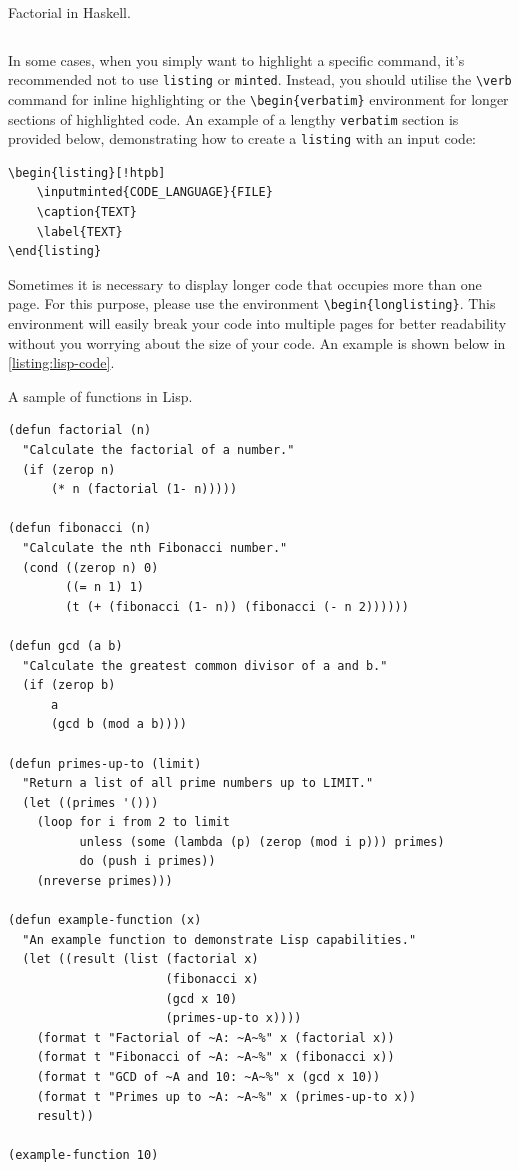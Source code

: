 \begin{listing}[!htpb]
\caption{Factorial in Haskell.}
\label{listing:haskell-code}
\inputminted{haskell}{Code/Factorial.hs}
\end{listing}

In some cases, when you simply want to highlight a specific command, it's recommended not to use \verb|listing| or \verb|minted|. Instead, you should utilise the \verb|\verb| command for inline highlighting or the \verb|\begin{verbatim}| environment for longer sections of highlighted code. An example of a lengthy \verb|verbatim| section is provided below, demonstrating how to create a \verb|listing| with an input code:

\begin{verbatim}
\begin{listing}[!htpb]
    \inputminted{CODE_LANGUAGE}{FILE}
    \caption{TEXT}
    \label{TEXT}
\end{listing}
\end{verbatim}

Sometimes it is necessary to display longer code that occupies more than one page. For this purpose, please use the environment \verb|\begin{longlisting}|. This environment will easily break your code into multiple pages for better readability without you worrying about the size of your code. An example is shown below in \autoref{listing:lisp-code}.

\begin{longlisting}
\caption{A sample of functions in Lisp.}
\label{listing:lisp-code}
\begin{verbatim}
(defun factorial (n)
  "Calculate the factorial of a number."
  (if (zerop n)
      (* n (factorial (1- n)))))

(defun fibonacci (n)
  "Calculate the nth Fibonacci number."
  (cond ((zerop n) 0)
        ((= n 1) 1)
        (t (+ (fibonacci (1- n)) (fibonacci (- n 2))))))

(defun gcd (a b)
  "Calculate the greatest common divisor of a and b."
  (if (zerop b)
      a
      (gcd b (mod a b))))

(defun primes-up-to (limit)
  "Return a list of all prime numbers up to LIMIT."
  (let ((primes '()))
    (loop for i from 2 to limit
          unless (some (lambda (p) (zerop (mod i p))) primes)
          do (push i primes))
    (nreverse primes)))

(defun example-function (x)
  "An example function to demonstrate Lisp capabilities."
  (let ((result (list (factorial x)
                      (fibonacci x)
                      (gcd x 10)
                      (primes-up-to x))))
    (format t "Factorial of ~A: ~A~%" x (factorial x))
    (format t "Fibonacci of ~A: ~A~%" x (fibonacci x))
    (format t "GCD of ~A and 10: ~A~%" x (gcd x 10))
    (format t "Primes up to ~A: ~A~%" x (primes-up-to x))
    result))

(example-function 10)
\end{verbatim}
\end{longlisting}

